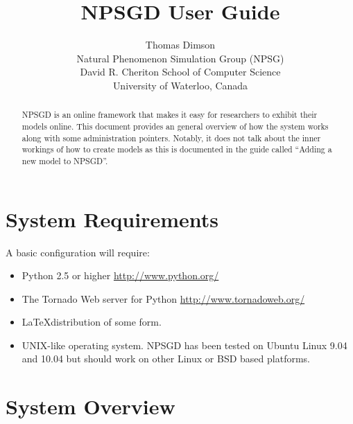 \documentclass{article}
\title{NPSGD User Guide}
\author{Thomas Dimson\\Natural Phenomenon Simulation Group (NPSG)\\David R. Cheriton School of Computer Science\\University of Waterloo, Canada}
\begin{document}
\maketitle
\begin{abstract}
    NPSGD is an online framework that makes it easy for researchers to exhibit
    their models online. This document provides an general overview of how the
    system works along with some administration pointers. Notably, it does
    not talk about the inner workings of how to create models as this is
    documented in the guide called ``Adding a new model to NPSGD''.
\end{abstract}
\tableofcontents

\section{System Requirements}
\label{sec:requirements}
A basic configuration will require:
\begin{itemize}
    \item Python 2.5 or higher \url{http://www.python.org/}
    \item The Tornado Web server for Python \url{http://www.tornadoweb.org/}
    \item \LaTeX distribution of some form.
    \item UNIX-like operating system. NPSGD has been tested on Ubuntu Linux 9.04
    and 10.04 but should work on other Linux or BSD based platforms.
\end{itemize}


\section{System Overview}
\end{document}
